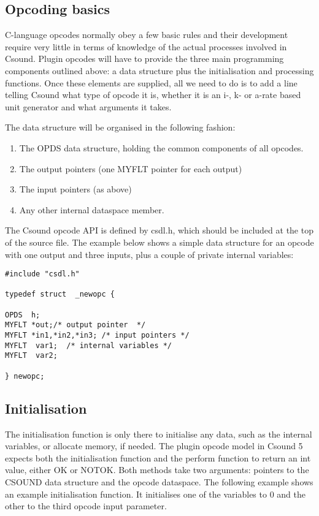 \documentclass[11pt]{article}
\begin{document}
\subsection {Opcoding basics}
C-language opcodes normally obey a few basic rules and their development require very little in terms of knowledge of the actual processes involved in Csound. Plugin opcodes will have to provide the three main programming components outlined above: a data structure plus the initialisation and processing functions. Once these elements are supplied, all we need to do is to add a line telling Csound what type of opcode it is, whether it is an i-, k- or a-rate based unit generator and what arguments it takes. 

The data structure will be organised in the following fashion:

\begin{enumerate}

\item	The OPDS data structure, holding the common components of all opcodes.
\item	The output pointers (one MYFLT pointer for each output)
\item	The input pointers (as above)
\item	Any other internal dataspace member.


\end{enumerate}



The Csound opcode API is defined by csdl.h, which should be included at the top of the source file. The example below shows a simple data structure for an opcode with one output and three inputs, plus a couple of private internal variables:

\begin{lstlisting}
#include "csdl.h"

typedef struct  _newopc {

OPDS  h;
MYFLT *out;/* output pointer  */
MYFLT *in1,*in2,*in3; /* input pointers */
MYFLT  var1;  /* internal variables */
MYFLT  var2;  

} newopc;
\end{lstlisting}

\subsection{Initialisation}

The initialisation function is only there to initialise any data, such as the internal variables, or allocate memory, if needed. The plugin opcode model in Csound 5 expects both the initialisation function and the perform function to return an int value, either OK or NOTOK. Both methods  take two arguments:  pointers to the CSOUND data structure and the opcode dataspace. The following example shows an example initialisation function. It initialises one of the variables to 0 and the other to the third opcode input parameter.
\end{document}
